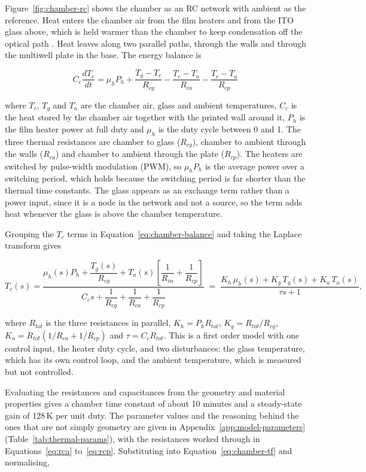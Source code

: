 Figure~\ref{fig:chamber-rc} shows the chamber as an RC network with ambient as the reference. Heat enters the chamber air from the film heaters and from the ITO glass above, which is held warmer than the chamber to keep condensation off the optical path \citep{noauthor_stage_nodate}. Heat leaves along two parallel paths, through the walls and through the multiwell plate in the base. The energy balance is

\begin{equation}
C_c \frac{dT_c}{dt} = \mu_h P_h + \frac{T_g - T_c}{R_{cg}} - \frac{T_c - T_a}{R_{ca}} - \frac{T_c - T_a}{R_{cp}}
\label{eq:chamber-balance}
\end{equation}

where $T_c$, $T_g$ and $T_a$ are the chamber air, glass and ambient temperatures, $C_c$ is the heat stored by the chamber air together with the printed wall around it, $P_h$ is the film heater power at full duty and $\mu_h$ is the duty cycle between 0 and 1. The three thermal resistances are chamber to glass ($R_{cg}$), chamber to ambient through the walls ($R_{ca}$) and chamber to ambient through the plate ($R_{cp}$). The heaters are switched by pulse-width modulation (PWM), so $\mu_h P_h$ is the average power over a switching period, which holds because the switching period is far shorter than the thermal time constants. The glass appears as an exchange term rather than a power input, since it is a node in the network and not a source, so the term adds heat whenever the glass is above the chamber temperature.

Grouping the $T_c$ terms in Equation~\ref{eq:chamber-balance} and taking the Laplace transform gives

\begin{equation}
T_c(s) = \frac{\mu_h(s) P_h + \dfrac{T_g(s)}{R_{cg}} + T_a(s) \left[ \dfrac{1}{R_{ca}} + \dfrac{1}{R_{cp}} \right]}{C_c s + \dfrac{1}{R_{cg}} + \dfrac{1}{R_{ca}} + \dfrac{1}{R_{cp}}}
\;=\;
\frac{K_h\,\mu_h(s) + K_g\,T_g(s) + K_a\,T_a(s)}{\tau s + 1},
\label{eq:chamber-tf}
\end{equation}

where $R_{tot}$ is the three resistances in parallel, $K_h = P_h R_{tot}$, $K_g = R_{tot}/R_{cg}$, $K_a = R_{tot}(1/R_{ca} + 1/R_{cp})$ and $\tau = C_c R_{tot}$. This is a first order model with one control input, the heater duty cycle, and two disturbances: the glass temperature, which has its own control loop, and the ambient temperature, which is measured but not controlled.

Evaluating the resistances and capacitances from the geometry and material properties gives a chamber time constant of about 10 minutes and a steady-state gain of 128\,K per unit duty. The parameter values and the reasoning behind the ones that are not simply geometry are given in Appendix~\ref{app:model-parameters} (Table~\ref{tab:thermal-params}), with the resistances worked through in Equations~\ref{eq:rca} to~\ref{eq:rcp}. Substituting into Equation~\ref{eq:chamber-tf} and normalising,

